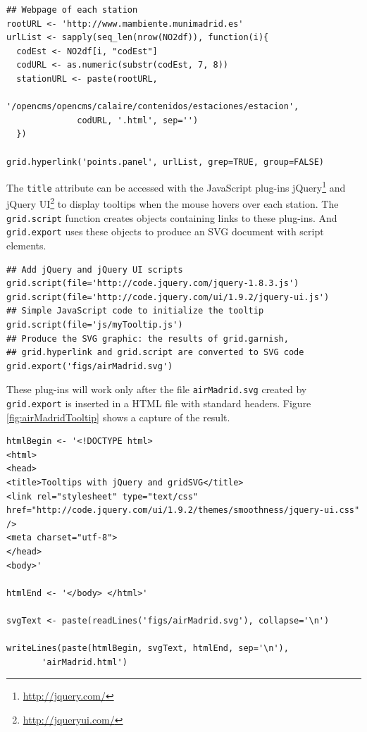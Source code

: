 \lstset{language=R,numbers=none}
\begin{lstlisting}
## Webpage of each station
rootURL <- 'http://www.mambiente.munimadrid.es'
urlList <- sapply(seq_len(nrow(NO2df)), function(i){
  codEst <- NO2df[i, "codEst"]
  codURL <- as.numeric(substr(codEst, 7, 8))
  stationURL <- paste(rootURL,
		      '/opencms/opencms/calaire/contenidos/estaciones/estacion',
		      codURL, '.html', sep='')
  })

grid.hyperlink('points.panel', urlList, grep=TRUE, group=FALSE)
\end{lstlisting}


The \texttt{title} attribute can be accessed with the JavaScript plug-ins
jQuery\footnote{\url{http://jquery.com/}} and jQuery UI\footnote{\url{http://jqueryui.com/}} to display tooltips when the mouse
hovers over each station. The \texttt{grid.script} function creates objects
containing links to these plug-ins. And \texttt{grid.export} uses these
objects to produce an SVG document with script elements.


\lstset{language=R,numbers=none}
\begin{lstlisting}
## Add jQuery and jQuery UI scripts
grid.script(file='http://code.jquery.com/jquery-1.8.3.js')
grid.script(file='http://code.jquery.com/ui/1.9.2/jquery-ui.js')
## Simple JavaScript code to initialize the tooltip
grid.script(file='js/myTooltip.js')
## Produce the SVG graphic: the results of grid.garnish,
## grid.hyperlink and grid.script are converted to SVG code
grid.export('figs/airMadrid.svg')
\end{lstlisting}

These plug-ins will work only after the file \texttt{airMadrid.svg} created by
\texttt{grid.export} is inserted in a HTML file with standard headers. Figure
\ref{fig:airMadridTooltip} shows a capture of the result.

\lstset{language=R,numbers=none}
\begin{lstlisting}
htmlBegin <- '<!DOCTYPE html>
<html>
<head>
<title>Tooltips with jQuery and gridSVG</title>
<link rel="stylesheet" type="text/css" href="http://code.jquery.com/ui/1.9.2/themes/smoothness/jquery-ui.css" />
<meta charset="utf-8">
</head>
<body>'

htmlEnd <- '</body> </html>'

svgText <- paste(readLines('figs/airMadrid.svg'), collapse='\n')

writeLines(paste(htmlBegin, svgText, htmlEnd, sep='\n'),
	   'airMadrid.html')
\end{lstlisting}




